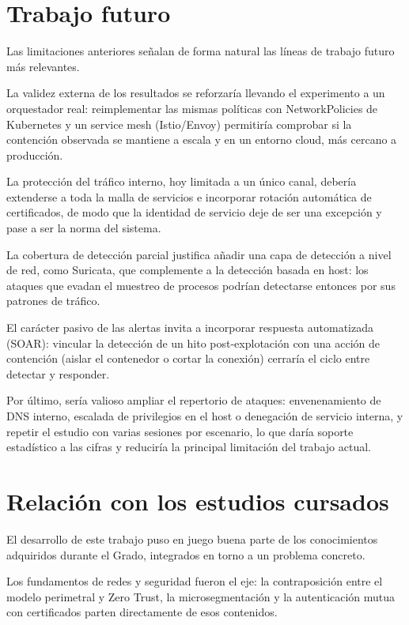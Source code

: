 \documentclass[11pt,spanish,listoffigures,listoftables]{tfgetsinf}
\begin{document}
        \section{Trabajo futuro}
        Las limitaciones anteriores señalan de forma natural las líneas de trabajo futuro más relevantes.

        La validez externa de los resultados se reforzaría llevando el experimento a un orquestador real: reimplementar las mismas políticas con NetworkPolicies de Kubernetes y un service mesh (Istio/Envoy) permitiría comprobar si la contención observada se mantiene a escala y en un entorno cloud, más cercano a producción.
        
        La protección del tráfico interno, hoy limitada a un único canal, debería extenderse a toda la malla de servicios e incorporar rotación automática de certificados, de modo que la identidad de servicio deje de ser una excepción y pase a ser la norma del sistema.
        
        La cobertura de detección parcial justifica añadir una capa de detección a nivel de red, como Suricata, que complemente a la detección basada en host: los ataques que evadan el muestreo de procesos podrían detectarse entonces por sus patrones de tráfico.
        
        El carácter pasivo de las alertas invita a incorporar respuesta automatizada (SOAR): vincular la detección de un hito post-explotación con una acción de contención (aislar el contenedor o cortar la conexión) cerraría el ciclo entre detectar y responder.
        
        Por último, sería valioso ampliar el repertorio de ataques: envenenamiento de DNS interno, escalada de privilegios en el host o denegación de servicio interna, y repetir el estudio con varias sesiones por escenario, lo que daría soporte estadístico a las cifras y reduciría la principal limitación del trabajo actual.

        \section{Relación con los estudios cursados}
        El desarrollo de este trabajo puso en juego buena parte de los conocimientos adquiridos durante el Grado, integrados en torno a un problema concreto. 

        Los fundamentos de redes y seguridad fueron el eje: la contraposición entre el modelo perimetral y Zero Trust, la microsegmentación y la autenticación mutua con certificados parten directamente de esos contenidos. 
        
\end{document}
